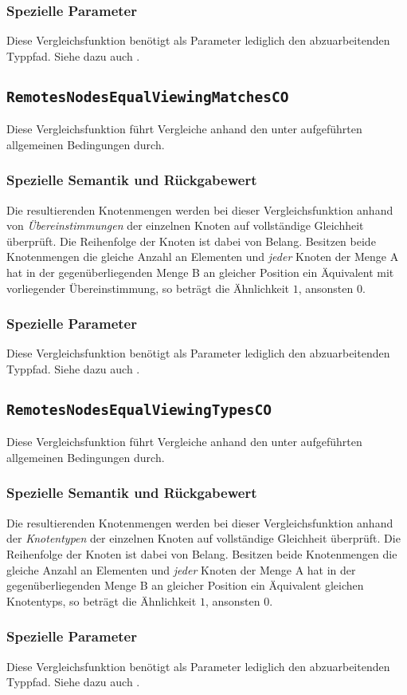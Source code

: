 \subsubsection*{Spezielle Parameter}
Diese Vergleichsfunktion benötigt als Parameter lediglich den abzuarbeitenden Typpfad. Siehe dazu auch .


\newpage
%
%
\subsection{\texttt{RemotesNodesEqualViewingMatchesCO}}
Diese Vergleichsfunktion führt Vergleiche anhand den unter  aufgeführten allgemeinen Bedingungen durch.

\subsubsection*{Spezielle Semantik und Rückgabewert}
Die resultierenden Knotenmengen werden bei dieser Vergleichsfunktion anhand von \emph{Übereinstimmungen} der einzelnen Knoten auf vollständige Gleichheit überprüft. Die Reihenfolge der Knoten ist dabei von Belang. Besitzen beide Knotenmengen die gleiche Anzahl an Elementen und \emph{jeder} Knoten der Menge A hat in der gegenüberliegenden Menge B an gleicher Position ein Äquivalent mit vorliegender Übereinstimmung, so beträgt die Ähnlichkeit $1$, ansonsten $0$.

\subsubsection*{Spezielle Parameter}
Diese Vergleichsfunktion benötigt als Parameter lediglich den abzuarbeitenden Typpfad. Siehe dazu auch .


%
%
\subsection{\texttt{RemotesNodesEqualViewingTypesCO}}
Diese Vergleichsfunktion führt Vergleiche anhand den unter  aufgeführten allgemeinen Bedingungen durch.

\subsubsection*{Spezielle Semantik und Rückgabewert}
Die resultierenden Knotenmengen werden bei dieser Vergleichsfunktion anhand der \emph{Knotentypen} der einzelnen Knoten auf vollständige Gleichheit überprüft. Die Reihenfolge der Knoten ist dabei von Belang. Besitzen beide Knotenmengen die gleiche Anzahl an Elementen und \emph{jeder} Knoten der Menge A hat in der gegenüberliegenden Menge B an gleicher Position ein Äquivalent gleichen Knotentyps, so beträgt die Ähnlichkeit $1$, ansonsten $0$.

\subsubsection*{Spezielle Parameter}
Diese Vergleichsfunktion benötigt als Parameter lediglich den abzuarbeitenden Typpfad. Siehe dazu auch .